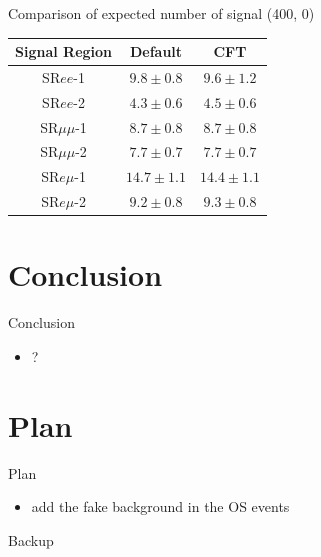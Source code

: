 \documentclass[mathserif,serif]{beamer}
\begin{document}
\begin{frame}{Comparison of expected number of signal (400, 0)}
\begin{tabular}{|c|c|c|}
\hline
Signal Region & Default & CFT \\
\hline
SR$ee$-1     & $9.8\pm0.8$ & $9.6\pm1.2$ \\
\hline
SR$ee$-2     & $4.3\pm0.6$ & $4.5\pm0.6$ \\
\hline
SR$\mu\mu$-1 & $8.7\pm0.8$ & $8.7\pm0.8$ \\
\hline
SR$\mu\mu$-2 & $7.7\pm0.7$ & $7.7\pm0.7$ \\
\hline
SR$e\mu$-1   & $14.7\pm1.1$ & $14.4\pm1.1$ \\
\hline
SR$e\mu$-2   & $9.2\pm0.8$ & $9.3\pm0.8$ \\
\hline
\end{tabular}
\end{frame}

\section{Conclusion}
\begin{frame}{Conclusion}
\begin{itemize}
\item ?
\end{itemize}
\end{frame}

\section{Plan}
\begin{frame}{Plan}
\begin{itemize}
\item add the fake background in the OS events
\end{itemize}
\end{frame}

\begin{frame}
\begin{center}
\huge
Backup
\end{center}
\end{frame}
\end{document}
